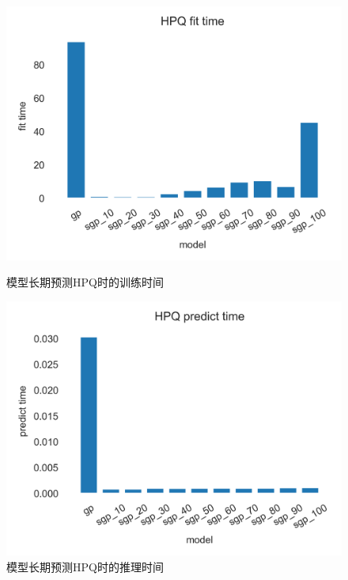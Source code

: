 \begin{figure}[!htbp]
    \centering
    \begin{minipage}[t]{0.49\textwidth}
    \centering
    \includegraphics[width=\textwidth]{images/lab1/HPQ_fit_time.png}
    \caption{模型长期预测HPQ时的训练时间}\label{1HPQfittime}
    \end{minipage}
    \begin{minipage}[t]{0.49\textwidth}
    \centering
    \includegraphics[width=\textwidth]{images/lab1/HPQ_predict_time.png}
    \caption{模型长期预测HPQ时的推理时间}\label{1HPQpredicttime}
    \end{minipage}
\end{figure}

